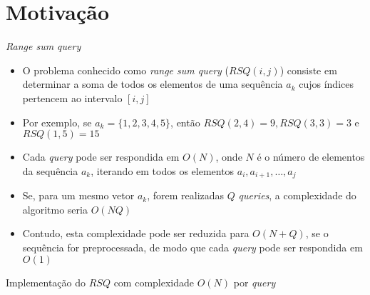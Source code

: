 \section{Motivação}

\begin{frame}[fragile]{\it {Range sum query}}

    \begin{itemize}
        \item O problema conhecido como \textit{range sum query} ($RSQ(i, j)$) consiste em 
            determinar a 
            soma de todos os elementos de uma sequência $a_k$ cujos índices pertencem ao
            intervalo $[i, j]$

        \item Por exemplo, se $a_k = \lbrace 1, 2, 3, 4, 5\rbrace$, então $RSQ(2, 4) = 9,
            RSQ(3, 3) = 3$ e $RSQ(1, 5) = 15$

        \item Cada \textit{query} pode ser respondida em $O(N)$, onde $N$ é o número de elementos
            da sequência $a_k$, iterando em todos os elementos $a_i, a_{i + 1}, \ldots, a_j$

        \item Se, para um mesmo vetor $a_k$, forem realizadas $Q$ \textit{queries}, a complexidade
            do algoritmo seria $O(NQ)$

        \item Contudo, esta complexidade pode ser reduzida para $O(N + Q)$, se o sequência 
            for preprocessada, de modo que cada \textit{query} pode ser respondida em $O(1)$

    \end{itemize}

\end{frame}

\begin{frame}[fragile]{Implementação do $RSQ$ com complexidade $O(N)$ por {\it query}}
\end{frame}

